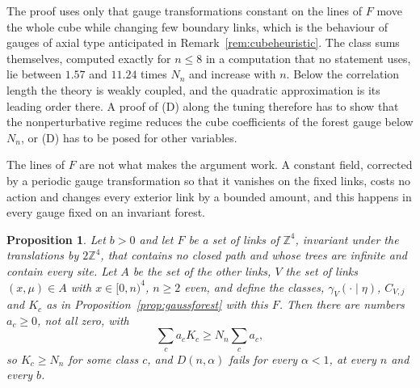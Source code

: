 \documentclass[aps,prd,twocolumn,superscriptaddress,nofootinbib,longbibliography,floatfix,amsmath,amssymb,10pt]{revtex4-2}
\newtheorem{proposition}[theorem]{Proposition}
\theoremstyle{definition}
\theoremstyle{remark}
\newcommand{\Z}{\mathbb{Z}}
\begin{document}
The proof uses only that gauge transformations constant on the lines of $F$
move the whole cube while changing few boundary links, which is the
behaviour of gauges of axial type anticipated in
Remark~\ref{rem:cubeheuristic}. The class sums themselves, computed exactly
for $n\le8$ in a computation that no statement uses, lie between $1.57$ and $11.24$ times $N_n$ and
increase with $n$. Below the correlation length the theory is weakly
coupled, and the quadratic approximation is its leading order there. A proof
of (D) along the tuning therefore has to show that the nonperturbative
regime reduces the cube coefficients of the forest gauge below $N_n$, or
(D) has to be posed for other variables.

The lines of $F$ are not what makes the argument work. A constant field,
corrected by a periodic gauge transformation so that it vanishes on the
fixed links, costs no action and changes every exterior link by a bounded
amount, and this happens in every gauge fixed on an invariant forest.

\begin{proposition}\label{prop:gaussevery}
Let $b>0$ and let $F$ be a set of links of $\Z^4$, invariant under the
translations by $2\Z^4$, that contains no closed path and whose trees are
infinite and contain every site. Let $A$ be the set of the other links, $V$
the set of links $(x,\mu)\in A$ with $x\in[0,n)^4$, $n\ge2$ even, and define
the classes, $\gamma_V(\cdot\mid\eta)$, $C_{V,j}$ and $K_c$ as in
Proposition~\ref{prop:gaussforest} with this $F$. Then there are numbers
$a_c\ge0$, not all zero, with
\[
\sum_ca_cK_c\ge N_n\sum_ca_c ,
\]
so $K_c\ge N_n$ for some class $c$, and $D(n,\alpha)$ fails for every
$\alpha<1$, at every $n$ and every $b$.
\end{proposition}
\end{document}
